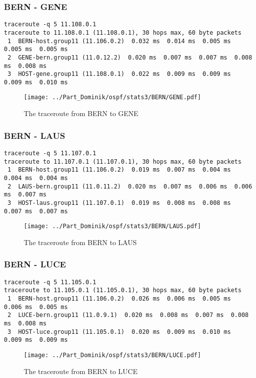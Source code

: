 \clearpage
\subsubsection{BERN - GENE}
\begin{lstlisting}
traceroute -q 5 11.108.0.1
traceroute to 11.108.0.1 (11.108.0.1), 30 hops max, 60 byte packets
 1  BERN-host.group11 (11.106.0.2)  0.032 ms  0.014 ms  0.005 ms  0.005 ms  0.005 ms
 2  GENE-bern.group11 (11.0.12.2)  0.020 ms  0.007 ms  0.007 ms  0.008 ms  0.008 ms
 3  HOST-gene.group11 (11.108.0.1)  0.022 ms  0.009 ms  0.009 ms  0.009 ms  0.010 ms
\end{lstlisting}
\begin{figure}[H]
\centering
\texttt{[image: ../Part\_Dominik/ospf/stats3/BERN/GENE.pdf]}
\caption{The traceroute from BERN to GENE}
\end{figure}
\clearpage
\subsubsection{BERN - LAUS}
\begin{lstlisting}
traceroute -q 5 11.107.0.1
traceroute to 11.107.0.1 (11.107.0.1), 30 hops max, 60 byte packets
 1  BERN-host.group11 (11.106.0.2)  0.019 ms  0.007 ms  0.004 ms  0.004 ms  0.004 ms
 2  LAUS-bern.group11 (11.0.11.2)  0.020 ms  0.007 ms  0.006 ms  0.006 ms  0.007 ms
 3  HOST-laus.group11 (11.107.0.1)  0.019 ms  0.008 ms  0.008 ms  0.007 ms  0.007 ms
\end{lstlisting}
\begin{figure}[H]
\centering
\texttt{[image: ../Part\_Dominik/ospf/stats3/BERN/LAUS.pdf]}
\caption{The traceroute from BERN to LAUS}
\end{figure}
\clearpage
\subsubsection{BERN - LUCE}
\begin{lstlisting}
traceroute -q 5 11.105.0.1
traceroute to 11.105.0.1 (11.105.0.1), 30 hops max, 60 byte packets
 1  BERN-host.group11 (11.106.0.2)  0.026 ms  0.006 ms  0.005 ms  0.006 ms  0.005 ms
 2  LUCE-bern.group11 (11.0.9.1)  0.020 ms  0.008 ms  0.007 ms  0.008 ms  0.008 ms
 3  HOST-luce.group11 (11.105.0.1)  0.020 ms  0.009 ms  0.010 ms  0.009 ms  0.009 ms
\end{lstlisting}
\begin{figure}[H]
\centering
\texttt{[image: ../Part\_Dominik/ospf/stats3/BERN/LUCE.pdf]}
\caption{The traceroute from BERN to LUCE}
\end{figure}
\clearpage
